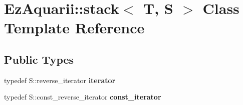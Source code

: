 \hypertarget{classEzAquarii_1_1stack}{}\section{Ez\+Aquarii\+:\+:stack$<$ T, S $>$ Class Template Reference}
\label{classEzAquarii_1_1stack}
\subsection*{Public Types}
\begin{DoxyCompactItemize}
\item 
typedef S\+::reverse\+\_\+iterator {\bfseries iterator}\hypertarget{classEzAquarii_1_1stack_aa90f54234fa3f44aa76455a034f67545}{}\label{classEzAquarii_1_1stack_aa90f54234fa3f44aa76455a034f67545}

\item 
typedef S\+::const\+\_\+reverse\+\_\+iterator {\bfseries const\+\_\+iterator}\hypertarget{classEzAquarii_1_1stack_a9c04a7fcb47dc3c07f9ad12d1fc554cf}{}\label{classEzAquarii_1_1stack_a9c04a7fcb47dc3c07f9ad12d1fc554cf}

\end{DoxyCompactItemize}

